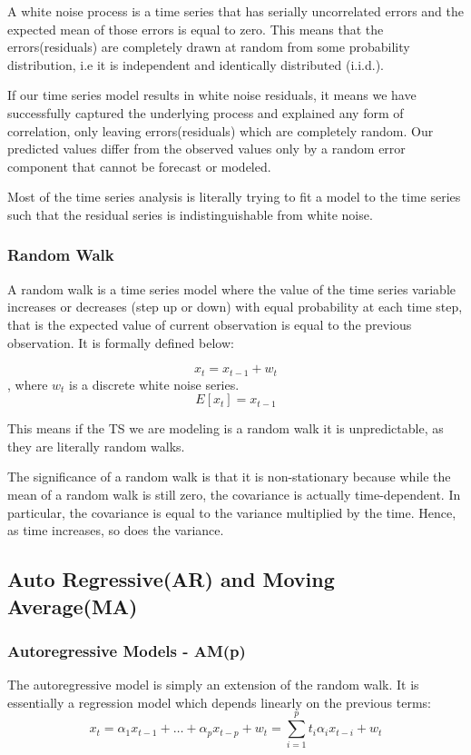 A white noise process is a time series that has serially uncorrelated errors and the expected mean of those errors is equal to zero. This means that the errors(residuals) are completely drawn at random from some probability distribution, i.e it is independent and identically distributed (i.i.d.). 

If our time series model results in white noise residuals, it means we have successfully captured the underlying process and explained any form of correlation, only leaving errors(residuals) which are completely random. Our predicted values differ from the observed values only by a random error component that cannot be forecast or modeled.

Most of the time series analysis is literally trying to fit a model to the time series such that the residual series is indistinguishable from white noise.

     	\subsubsection {Random Walk}
        
A random walk is a time series model where the value of the time series variable increases or decreases (step up or down) with equal probability at each time step, that is the expected value of current observation is equal to the previous observation. It is formally defined below:

$$x_t=x_{t-1}+w_t$$ , where $w_t$ is a discrete white noise series.
$$E[x_t]=x_{t-1}$$

This means if the TS we are modeling is a random walk it is unpredictable, as they are literally random walks.

The significance of a random walk is that it is non-stationary because while the mean of a random walk is still zero, the covariance is actually time-dependent. In particular, the covariance is equal to the variance multiplied by the time. Hence, as time increases, so does the variance.
 
\subsection {Auto Regressive(AR) and Moving Average(MA)}
		\subsubsection {Autoregressive Models - AM(p)}
        
The autoregressive model is simply an extension of the random walk. It is essentially a regression model which depends linearly on the previous terms:
$$x_t = \alpha_1x_{t-1}+…+\alpha_px_{t-p}+w_t = \sum_{i=1}^{p} t_i\alpha_ix_{t-i}+w_t$$

